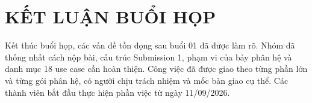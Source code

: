 \documentclass[10pt,a4paper]{article}
\begin{document}
\section{KẾT LUẬN BUỔI HỌP}

Kết thúc buổi họp, các vấn đề tồn đọng sau buổi 01 đã được làm rõ. Nhóm đã thống nhất cách nộp bài, cấu trúc Submission 1, phạm vi của bảy phân hệ và danh mục 18 use case cần hoàn thiện. Công việc đã được giao theo từng phần lớn và từng gói phân hệ, có người chịu trách nhiệm và mốc bàn giao cụ thể. Các thành viên bắt đầu thực hiện phần việc từ ngày 11/09/2026.
\end{document}
